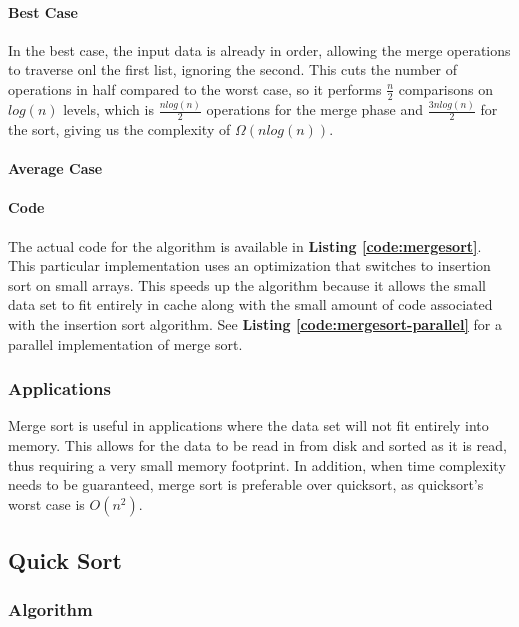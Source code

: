 \documentclass{article}
\begin{document}
        \paragraph{Best Case}
          In the best case, the input data is already in order, allowing the
          merge operations to traverse onl the first list, ignoring the second.
          This cuts the number of operations in half compared to the worst
          case, so it performs $\frac{n}{2}$ comparisons on $log(n)$ levels,
          which is $\frac{n log(n)}{2}$ operations for the merge phase and
          $\frac{3n log(n)}{2}$ for the sort, giving us the complexity of
          $\Omega(n log(n))$.
        \paragraph{Average Case}
          
        \paragraph{Code}
          The actual code for the algorithm is available in \textbf{Listing
          \ref{code:mergesort}}.  This particular implementation uses an
          optimization that switches to insertion sort on small arrays.  This
          speeds up the algorithm because it allows the small data set to fit
          entirely in cache along with the small amount of code associated with
          the insertion sort algorithm.  See \textbf{Listing
          \ref{code:mergesort-parallel}} for a parallel implementation of merge
          sort.
      \subsubsection{Applications}
        Merge sort is useful in applications where the data set will not fit
        entirely into memory.  This allows for the data to be read in from disk
        and sorted as it is read, thus requiring a very small memory footprint.
        In addition, when time complexity needs to be guaranteed, merge sort is
        preferable over quicksort, as quicksort's worst case is $O(n^2)$.
   \subsection{Quick Sort}
      \subsubsection{Algorithm}
\end{document}
